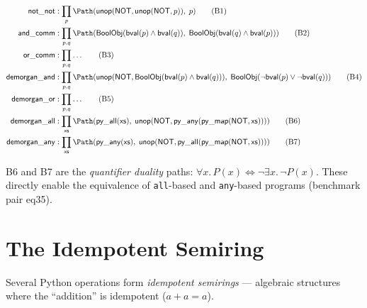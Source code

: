 \begin{definition}
\begin{align}
  \mathsf{not\_not} &: \prod_p
    \Path(\mathsf{unop}(\mathsf{NOT}, \mathsf{unop}(\mathsf{NOT}, p)),\; p)
    \tag{B1} \\
  \mathsf{and\_comm} &: \prod_{p,q}
    \Path(\mathsf{BoolObj}(\mathsf{bval}(p) \land \mathsf{bval}(q)),\;
          \mathsf{BoolObj}(\mathsf{bval}(q) \land \mathsf{bval}(p)))
    \tag{B2} \\
  \mathsf{or\_comm} &: \prod_{p,q} \ldots
    \tag{B3} \\
  \mathsf{demorgan\_and} &: \prod_{p,q}
    \Path(\mathsf{unop}(\mathsf{NOT},
      \mathsf{BoolObj}(\mathsf{bval}(p) \land \mathsf{bval}(q))),\;
      \mathsf{BoolObj}(\lnot\mathsf{bval}(p) \lor \lnot\mathsf{bval}(q)))
    \tag{B4} \\
  \mathsf{demorgan\_or} &: \prod_{p,q} \ldots
    \tag{B5} \\
  \mathsf{demorgan\_all} &: \prod_{\mathsf{xs}}
    \Path(\mathsf{py\_all}(\mathsf{xs}),\;
          \mathsf{unop}(\mathsf{NOT},
          \mathsf{py\_any}(\mathsf{py\_map}(\mathsf{NOT}, \mathsf{xs}))))
    \tag{B6} \\
  \mathsf{demorgan\_any} &: \prod_{\mathsf{xs}}
    \Path(\mathsf{py\_any}(\mathsf{xs}),\;
          \mathsf{unop}(\mathsf{NOT},
          \mathsf{py\_all}(\mathsf{py\_map}(\mathsf{NOT}, \mathsf{xs}))))
    \tag{B7}
\end{align}
\end{definition}

B6 and B7 are the \emph{quantifier duality} paths: $\forall x.\, P(x)
\iff \lnot\exists x.\, \lnot P(x)$.  These directly enable the
equivalence of \texttt{all}-based and \texttt{any}-based programs
(benchmark pair eq35).


\section{The Idempotent Semiring}

Several Python operations form \emph{idempotent semirings} --- algebraic
structures where the ``addition'' is idempotent ($a + a = a$).


